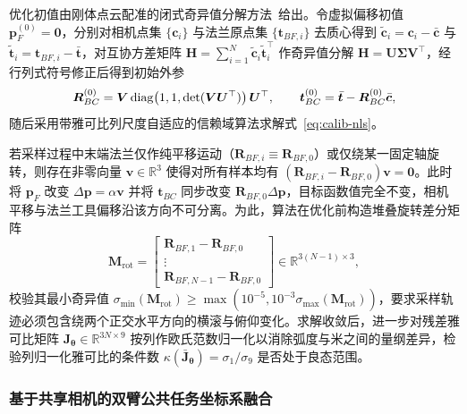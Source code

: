 优化初值由刚体点云配准的闭式奇异值分解方法~\cite{umeyama1991least}给出。令虚拟偏移初值 $\bm{p}_F^{(0)} = \bm{0}$，分别对相机点集 $\{\bm{c}_i\}$ 与法兰原点集 $\{\bm{t}_{BF,i}\}$ 去质心得到 $\tilde{\bm{c}}_i = \bm{c}_i - \bar{\bm{c}}$ 与 $\tilde{\bm{t}}_i = \bm{t}_{BF,i} - \bar{\bm{t}}$，对互协方差矩阵 $\bm{H} = \sum_{i=1}^{N} \tilde{\bm{c}}_i \tilde{\bm{t}}_i^{\top}$ 作奇异值分解 $\bm{H} = \bm{U}\bm{\Sigma}\bm{V}^{\top}$，经行列式符号修正后得到初始外参
\begin{equation}
  \bm{R}_{BC}^{(0)} = \bm{V}\operatorname{diag}\!\left(1, 1, \det(\bm{V}\bm{U}^{\top})\right)\bm{U}^{\top}, \qquad
  \bm{t}_{BC}^{(0)} = \bar{\bm{t}} - \bm{R}_{BC}^{(0)}\bar{\bm{c}},
  \label{eq:umeyama-init}
\end{equation}
随后采用带雅可比列尺度自适应的信赖域算法求解式~\eqref{eq:calib-nls}。

若采样过程中末端法兰仅作纯平移运动（$\bm{R}_{BF,i} \equiv \bm{R}_{BF,0}$）或仅绕某一固定轴旋转，则存在非零向量 $\bm{v} \in \mathbb{R}^3$ 使得对所有样本均有 $(\bm{R}_{BF,i} - \bm{R}_{BF,0})\bm{v} = \bm{0}$。此时将 $\bm{p}_F$ 改变 $\Delta\bm{p} = \alpha\bm{v}$ 并将 $\bm{t}_{BC}$ 同步改变 $\bm{R}_{BF,0}\Delta\bm{p}$，目标函数值完全不变，相机平移与法兰工具偏移沿该方向不可分离。为此，算法在优化前构造堆叠旋转差分矩阵
\begin{equation}
  \bm{M}_{\text{rot}} = \begin{bmatrix} \bm{R}_{BF,1} - \bm{R}_{BF,0} \\ \vdots \\ \bm{R}_{BF,N-1} - \bm{R}_{BF,0} \end{bmatrix} \in \mathbb{R}^{3(N-1)\times 3},
  \label{eq:calib-observability}
\end{equation}
校验其最小奇异值 $\sigma_{\min}(\bm{M}_{\text{rot}}) \ge \max(10^{-5}, 10^{-3}\sigma_{\max}(\bm{M}_{\text{rot}}))$，要求采样轨迹必须包含绕两个正交水平方向的横滚与俯仰变化。求解收敛后，进一步对残差雅可比矩阵 $\bm{J}_{\bm{\theta}} \in \mathbb{R}^{3N\times 9}$ 按列作欧氏范数归一化以消除弧度与米之间的量纲差异，检验列归一化雅可比的条件数 $\kappa(\bar{\bm{J}}_{\bm{\theta}}) = \sigma_1 / \sigma_9$ 是否处于良态范围。

\subsubsection{基于共享相机的双臂公共任务坐标系融合}

